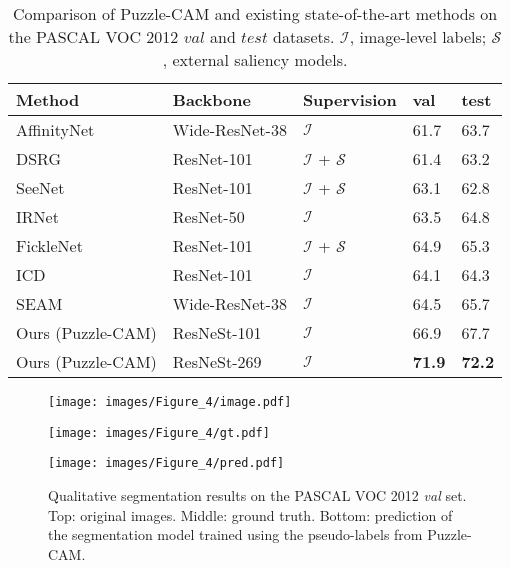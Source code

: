 \documentclass{article}
\begin{document}
\begin{table}[t]
\caption{
Comparison of Puzzle-CAM and existing state-of-the-art methods on the PASCAL VOC 2012 $val$ and $test$ datasets. 
$\mathcal{I}$, image-level labels;  $\mathcal{S}$, external saliency models.
}
\footnotesize
\centering
{
\begin{tabu} to \linewidth{X[c,1.2] X[c,1.0] X[c,0.75]  | X[c,0.2]  X[c,0.2] }  \hline \hline
Method  & Backbone & Supervision & val & test \\ \hline
AffinityNet~\cite{ahn2018learning} & Wide-ResNet-38 & $\mathcal{I}$ & 61.7 & 63.7 \\
DSRG~\cite{huang2018weakly} & ResNet-101 & $\mathcal{I}$ + $\mathcal{S}$ & 61.4 & 63.2 \\ 
SeeNet~\cite{hou2018self} & ResNet-101 & $\mathcal{I}$ + $\mathcal{S}$ & 63.1 & 62.8 \\
IRNet~\cite{ahn2018learning} & ResNet-50 & $\mathcal{I}$ & 63.5 & 64.8 \\
FickleNet~\cite{lee2019ficklenet} & ResNet-101 & $\mathcal{I}$ + $\mathcal{S}$ & 64.9 & 65.3 \\ 
ICD~\cite{fan2020learning} & ResNet-101 & $\mathcal{I}$ & 64.1 & 64.3 \\ 
SEAM~\cite{Wang_2020_CVPR} & Wide-ResNet-38 & $\mathcal{I}$ & 64.5 & 65.7 \\ \hline
Ours (Puzzle-CAM) & ResNeSt-101 & $\mathcal{I}$ & 66.9 & 67.7 \\
Ours (Puzzle-CAM) & ResNeSt-269 & $\mathcal{I}$ & \textbf{71.9} & \textbf{72.2} \\

\hline\hline
\end{tabu}
}
\label{tb:final}
\end{table}

\begin{figure}
\begin{minipage}[b]{1.0\linewidth}
  \centering
  \centerline{\texttt{[image: images/Figure\_4/image.pdf]}}
\end{minipage}

\begin{minipage}[b]{1.0\linewidth}
  \centering
  \centerline{\texttt{[image: images/Figure\_4/gt.pdf]}}
\end{minipage}

\begin{minipage}[b]{1.0\linewidth}
  \centering
  \centerline{\texttt{[image: images/Figure\_4/pred.pdf]}}
\end{minipage}

\caption{Qualitative segmentation results on the PASCAL VOC 2012 \textit{val} set. Top: original images. Middle: ground truth. Bottom: prediction of the segmentation model trained using the pseudo-labels from Puzzle-CAM.}
\label{fig:result}
\vspace{-4mm}
\end{figure}
\end{document}
